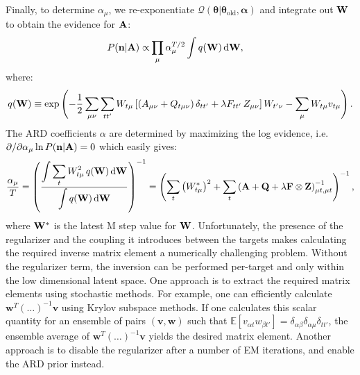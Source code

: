 \documentclass[nofootinbib,amssymb,amsmath]{revtex4}
\newcommand{\vn}{{\bf n}}
\newcommand{\vQ}{{\bf Q}}
\newcommand{\vW}{{\bf W}}
\newcommand{\vF}{{\bf F}}
\newcommand{\vZ}{{\bf Z}}
\newcommand{\vtheta}{{\boldsymbol \theta}}
\newcommand{\valpha}{{\boldsymbol \alpha}}
\newcommand{\vA}{{\bf A}}
\newcommand{\EE}{\mathbb{E}}
\begin{document}
\noindent Finally, to determine $\alpha_\mu$, we re-exponentiate $\mathcal{Q}(\vtheta|\vtheta_\mathrm{old}, \valpha)$ and integrate out $\vW$ to obtain the evidence for $\vA$:
%
\begin{align}
P(\vn | \vA) \propto& \prod_\mu \alpha_\mu^{T/2} \int q(\vW) \, \mathrm{d} \vW,
\label{ARD_evidence}
\end{align}
where:
\begin{equation}
q(\vW) \equiv \exp\left(-\frac{1}{2} \sum_{\mu\nu} \sum_{tt'} W_{t \mu} \left[\left(A_{\mu\nu} + Q_{t\mu\nu}\right)\delta_{tt'} + \lambda F_{tt'}\,Z_{\mu\nu}\right] W_{t' \nu} - \sum_\mu W_{t\mu} v_{t\mu}\right).
\end{equation}
%
The ARD coefficients $\alpha$ are determined by maximizing the log evidence, i.e. $\partial/\partial \alpha_\mu \ln P(\vn | \vA) = 0$ which easily gives:
\begin{equation}
\frac{\alpha_\mu}{T} = \left(\frac{\displaystyle\int \sum_t W^2_{t\mu}\, q(\vW)\,\mathrm{d}\vW}{\displaystyle\int q(\vW) \, \mathrm{d}\vW}\right)^{-1} = \left(\sum_t \left(W_{t\mu}^*\right)^2 + \sum_t\left(\vA + \vQ + \lambda \vF \otimes \vZ \right)^{-1}_{\mu t, \mu t}\right)^{-1},
\end{equation}
where $\vW^*$ is the latest M step value for $\vW$. Unfortunately, the presence of the regularizer and the coupling it introduces between the targets makes calculating the required inverse matrix element a numerically challenging problem. Without the regularizer term, the inversion can be performed per-target and only within the low dimensional latent space. One approach is to extract the required matrix elements using stochastic methods. For example, one can efficiently calculate $\mathbf{w}^T \left(\ldots\right)^{-1} \mathbf{v}$ using Krylov subspace methods. If one calculates this scalar quantity for an ensemble of pairs $(\mathbf{v}, \mathbf{w})$ such that $\EE[v_{\alpha t} w_{\beta t'}] = \delta_{\alpha\beta}\delta_{\alpha\mu}\delta_{tt'}$, the ensemble average of $\mathbf{w}^T \left(\ldots\right)^{-1} \mathbf{v}$ yields the desired matrix element. Another approach is to disable the regularizer after a number of EM iterations, and enable the ARD prior instead.
\end{document}
